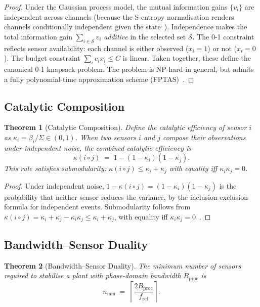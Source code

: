 \documentclass[10pt,twocolumn]{article}
\theoremstyle{plain}
\newtheorem{theorem}{Theorem}[section]
\theoremstyle{definition}
\theoremstyle{remark}
\newcommand{\Scal}{\mathcal{S}}
\newcommand{\fref}{f_{\mathrm{ref}}}
\newcommand{\Bproc}{B_{\mathrm{proc}}}
\begin{document}
\begin{proof}
Under the Gaussian process model, the mutual information gains
$\{v_i\}$ are independent across channels (because the S-entropy
normalisation renders channels conditionally independent given the
state~\cite{Cover2006}).  Independence makes the total information gain
$\sum_{i\in\Scal} v_i$ \emph{additive} in the selected set $\Scal$.
The 0-1 constraint reflects sensor availability: each channel is either
observed ($x_i=1$) or not ($x_i=0$).  The budget constraint
$\sum_i c_i x_i \leq C$ is linear.  Taken together, these define the
canonical 0-1 knapsack problem.  The problem is NP-hard in general,
but admits a fully polynomial-time approximation scheme
(FPTAS)~\cite{Cover2006}.
\end{proof}

\subsection{Catalytic Composition}
\label{ssec:catalytic}

\begin{theorem}[Catalytic Composition]
\label{thm:catalytic}
Define the \emph{catalytic efficiency} of sensor $i$ as
$\kappa_i = \beta_i/\Sigma \in (0,1)$.
When two sensors $i$ and $j$ compose their observations under
independent noise, the combined catalytic efficiency is
\begin{equation}
  \kappa(i \circ j) \;=\; 1 - (1-\kappa_i)(1-\kappa_j).
  \label{eq:catalytic}
\end{equation}
This rule satisfies submodularity:
$\kappa(i\circ j) \leq \kappa_i + \kappa_j$ with equality iff
$\kappa_i\kappa_j = 0$.
\end{theorem}

\begin{proof}
Under independent noise,
$1 - \kappa(i\circ j) = (1-\kappa_i)(1-\kappa_j)$
is the probability that neither sensor reduces the variance,
by the inclusion-exclusion formula for independent events.
Submodularity follows from
$\kappa(i\circ j) = \kappa_i + \kappa_j - \kappa_i\kappa_j
\leq \kappa_i + \kappa_j$,
with equality iff $\kappa_i\kappa_j = 0$~\cite{Cover2006}.
\end{proof}

\subsection{Bandwidth--Sensor Duality}
\label{ssec:bsd}

\begin{theorem}[Bandwidth--Sensor Duality]
\label{thm:bsd}
The minimum number of sensors required to stabilise a plant with
phase-domain bandwidth $\Bproc$ is
\begin{equation}
  n_{\min} \;=\; \left\lceil \frac{2\Bproc}{\fref} \right\rceil.
  \label{eq:nmin}
\end{equation}
\end{theorem}
\end{document}
